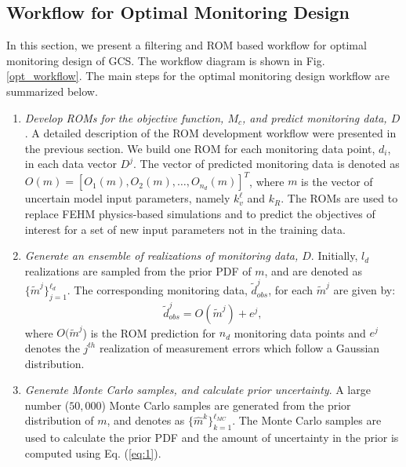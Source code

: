 \documentclass[a4paper,fleqn]{cas-sc}
\begin{document}
\subsection{Workflow for Optimal Monitoring Design}
In this section, we present a filtering and ROM based workflow for optimal monitoring design of GCS. The workflow diagram is shown in Fig. \ref{opt_workflow}. The main steps for the optimal monitoring design workflow are summarized below.

\begin{enumerate}[Step 1.]
\item \textit{Develop ROMs for the objective function, $M_c$, and predict monitoring data, $D$}. A detailed description of the ROM development workflow were presented in the previous section. We build one ROM for each monitoring data point, $d_i$, in each data vector $D^j$. The vector of predicted monitoring data is denoted as $O(m)=[O_1(m), O_2(m), \ldots,O_{n_d}(m)]^T$, where $m$ is the vector of uncertain model input parameters, namely $k_v^\ell$ and $k_R$. The ROMs are used to replace FEHM physics-based simulations and to predict the objectives of interest for a set of new input parameters not in the training data.

\item \textit{Generate an ensemble of realizations of monitoring data, $D$}. Initially, $l_d$ realizations are sampled from the prior PDF of $m$, and are denoted as $ \{\widetilde{m}^j\}_{j=1}^{\ell_d}$. The corresponding monitoring data, $\widetilde{d}_{obs}^j$, for each $\widetilde{m}^j$ are given by:
\begin{equation} \label{eq:4}
    \widetilde{d}_{obs}^j = O(\widetilde{m}^j) + e^j ,
\end{equation}
where $O(\widetilde{m}^j$) is the ROM prediction for $n_d$ monitoring data points and $e^j$ denotes the $j^{th}$ realization of measurement errors which follow a Gaussian distribution.

\item \textit{Generate Monte Carlo samples, and calculate prior uncertainty}. A large number ($50,000$) Monte Carlo samples are generated from the prior distribution of $m$, and denotes as $\{\hat{m}^k\}_{k=1}^{\ell_{MC}}$. The Monte Carlo samples are used to calculate the prior PDF and the amount of uncertainty in the prior is computed using Eq. (\ref{eq:1}).


\end{enumerate}
\end{document}
